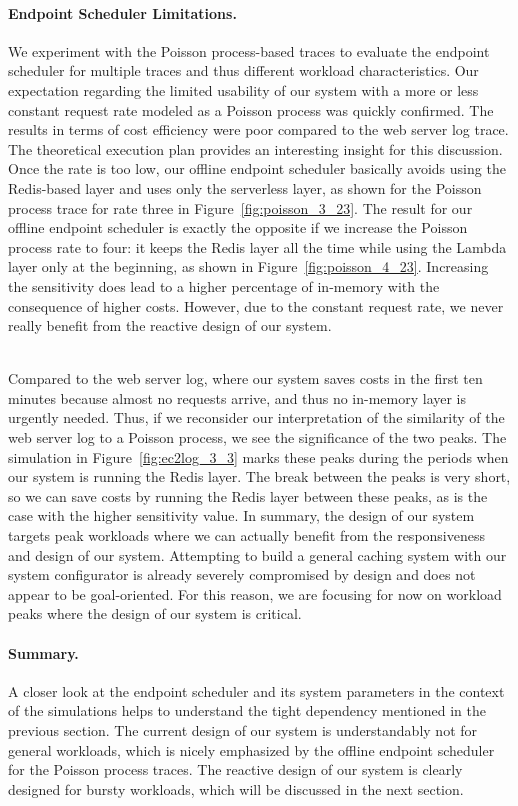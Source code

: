\paragraph{Endpoint Scheduler Limitations.}
We experiment with the Poisson process-based traces to evaluate the endpoint scheduler for multiple traces and thus different workload characteristics. Our expectation regarding the limited usability of our system with a more or less constant request rate modeled as a Poisson process was quickly confirmed. The results in terms of cost efficiency were poor compared to the web server log trace. The theoretical execution plan provides an interesting insight for this discussion. Once the rate is too low, our offline endpoint scheduler basically avoids using the Redis-based layer and uses only the serverless layer, as shown for the Poisson process trace for rate three in Figure~\ref{fig:poisson_3_23}. The result for our offline endpoint scheduler is exactly the opposite if we increase the Poisson process rate to four: it keeps the Redis layer all the time while using the Lambda layer only at the beginning, as shown in Figure~\ref{fig:poisson_4_23}. Increasing the sensitivity does lead to a higher percentage of in-memory with the consequence of higher costs. However, due to the constant request rate, we never really benefit from the reactive design of our system. 

~\\
Compared to the web server log, where our system saves costs in the first ten minutes because almost no requests arrive, and thus no in-memory layer is urgently needed. Thus, if we reconsider our interpretation of the similarity of the web server log to a Poisson process, we see the significance of the two peaks. The simulation in Figure~\ref{fig:ec2log_3_3} marks these peaks during the periods when our system is running the Redis layer. The break between the peaks is very short, so we can save costs by running the Redis layer between these peaks, as is the case with the higher sensitivity value. In summary, the design of our system targets peak workloads where we can actually benefit from the responsiveness and design of our system. Attempting to build a general caching system with our system configurator is already severely compromised by design and does not appear to be goal-oriented. For this reason, we are focusing for now on workload peaks where the design of our system is critical.

\paragraph{Summary.}
A closer look at the endpoint scheduler and its system parameters in the context of the simulations helps to understand the tight dependency mentioned in the previous section. The current design of our system is understandably not for general workloads, which is nicely emphasized by the offline endpoint scheduler for the Poisson process traces. The reactive design of our system is clearly designed for bursty workloads, which will be discussed in the next section. 

